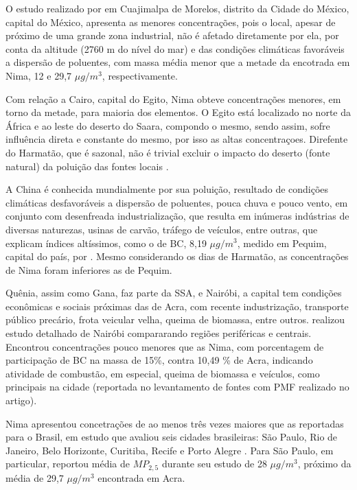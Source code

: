 O estudo realizado por \citet{diaz2014} em Cuajimalpa de Morelos, distrito 
da Cidade do México, capital do México, 
apresenta as menores concentrações, pois o local, apesar de próximo
de uma grande zona industrial, não é afetado diretamente por ela, por conta
da altitude (2760 m do nível do mar) e das condições climáticas favoráveis a
dispersão de poluentes, com massa média menor que a metade da encotrada em Nima, 
12 e 29,7 $\mu g/m^3$, respectivamente.

Com relação a Cairo, capital do Egito, Nima obteve concentrações menores, 
em torno da metade, para maioria dos elementos. O Egito está localizado 
no norte da África e ao leste do deserto do Saara, compondo o mesmo, sendo assim,
sofre influência direta e constante do mesmo, por isso as altas concentraçoes. 
Direfente do Harmatão, que é sazonal, não é trivial excluir o impacto 
do deserto (fonte natural) da poluição das fontes locais \citet{boman2013}.

A China é conhecida mundialmente por sua poluição, resultado de condições
climáticas desfavoráveis a dispersão de poluentes, pouca chuva e pouco vento, 
em conjunto com desenfreada industrialização, que resulta em inúmeras indústrias
de diversas naturezas, usinas de carvão, tráfego de veículos, entre outras, 
que explicam índices altíssimos, como o de BC, 8,19 $\mu g/m^3$, 
medido em Pequim, capital do país, por \citet{yang2011}. Mesmo considerando 
os dias de Harmatão, as concentrações de Nima foram inferiores as de Pequim.

Quênia, assim como Gana, faz parte da SSA, e Nairóbi, a capital tem condições
econômicas e sociais próximas das de Acra, com recente industrização, transporte
público precário, frota veicular velha, queima de biomassa, entre outros.  
\citet{gaita2014} realizou estudo detalhado de Nairóbi compararando regiões 
periféricas e centrais. Encontrou concentrações pouco menores que as Nima, 
com porcentagem de participação de BC na massa de 15\%, contra 10,49 \% de Acra,
indicando atividade de combustão, em especial, queima de biomassa e veículos, 
como principais na cidade (reportada no levantamento de fontes com PMF realizado
no artigo). 

Nima apresentou concetrações de ao menos três vezes maiores que as reportadas 
para o Brasil, em estudo que avaliou seis cidades brasileiras: São Paulo, 
Rio de Janeiro, Belo Horizonte, Curitiba, Recife e Porto Alegre
\citep{andrade2012urban}. Para São Paulo, em particular, \citet{andrade2012}
reportou média de $MP_{2,5}$ durante seu estudo de 28 $\mu g / m^3$, 
próximo da média de 29,7 $\mu g / m^3$ encontrada em Acra. 

